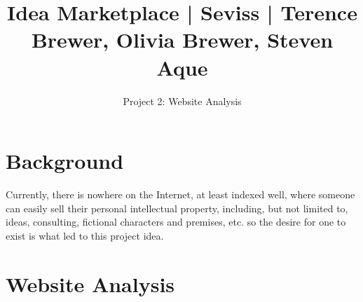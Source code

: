 \documentclass[]{article}
\title{Idea Marketplace | Seviss | Terence Brewer, Olivia Brewer, Steven Aque}
\author{Project 2: Website Analysis}
\begin{document}
\maketitle

\section{Background}
	Currently, there is nowhere on the Internet, at least indexed well, where someone can easily sell their personal intellectual property, including, but not limited to, ideas, consulting, fictional characters and premises, etc. so the desire for one to exist is what led to this project idea.

\section{Website Analysis}
\end{document}
